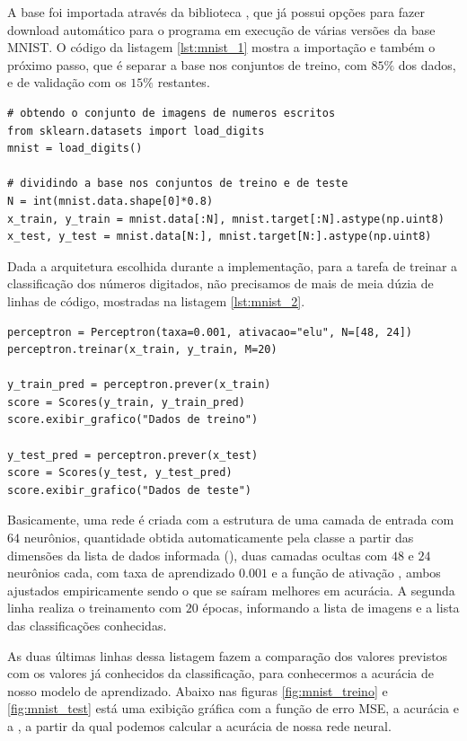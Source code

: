 A base foi importada através da biblioteca , que já possui opções para fazer download automático para o programa em execução de várias versões da base MNIST. O código da listagem \ref{lst:mnist_1} mostra a importação e também o próximo passo, que é separar a base nos conjuntos de treino, com $85\%$ dos dados, e de validação com os $15\%$ restantes.
\newline
\estiloR
\begin{lstlisting}[caption={Trecho do script \eng{mnist\_test.py}}, label={lst:mnist_1}, escapeinside={\%}]
# obtendo o conjunto de imagens de numeros escritos
from sklearn.datasets import load_digits
mnist = load_digits()

# dividindo a base nos conjuntos de treino e de teste
N = int(mnist.data.shape[0]*0.8)
x_train, y_train = mnist.data[:N], mnist.target[:N].astype(np.uint8)
x_test, y_test = mnist.data[N:], mnist.target[N:].astype(np.uint8)
\end{lstlisting}


Dada a arquitetura escolhida durante a implementação, para a tarefa de treinar a classificação dos números digitados, não precisamos de mais de meia dúzia de linhas de código, mostradas na listagem \ref{lst:mnist_2}.
\newline
\estiloR
\begin{lstlisting}[caption={Trecho do script \eng{mnist\_test.py}}, label={lst:mnist_2}, escapeinside={\%}]
perceptron = Perceptron(taxa=0.001, ativacao="elu", N=[48, 24])
perceptron.treinar(x_train, y_train, M=20)

y_train_pred = perceptron.prever(x_train)
score = Scores(y_train, y_train_pred)
score.exibir_grafico("Dados de treino")

y_test_pred = perceptron.prever(x_test)
score = Scores(y_test, y_test_pred)
score.exibir_grafico("Dados de teste")
\end{lstlisting}


Basicamente, uma rede é criada com a estrutura de uma camada de entrada com $64$ neurônios, quantidade obtida automaticamente pela classe a partir das dimensões da lista de dados informada (), duas camadas ocultas com $48$ e $24$ neurônios cada, com taxa de aprendizado $0.001$ e a função de ativação , ambos ajustados empiricamente sendo o que se saíram melhores em acurácia. A segunda linha realiza o treinamento com $20$ épocas, informando a lista de imagens e a lista das classificações conhecidas.

As duas últimas linhas dessa listagem fazem a comparação dos valores previstos com os valores já conhecidos da classificação, para conhecermos a acurácia de nosso modelo de aprendizado. Abaixo nas figuras \ref{fig:mnist_treino} e \ref{fig:mnist_test} está uma exibição gráfica com a função de erro MSE, a acurácia e a , a partir da qual podemos calcular a acurácia de nossa rede neural.

